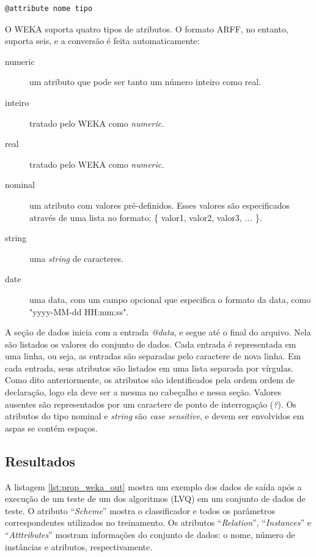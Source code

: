 \begin{lstlisting}[caption=Formato de uma entrada \emph{@attribute}, label=lst:prop_attribute_out]
@attribute nome tipo
\end{lstlisting}

O WEKA suporta quatro tipos de atributos. O formato ARFF, no entanto, suporta seis, e a conversão é feita automaticamente:

\begin{description}
    \item[numeric] um atributo que pode ser tanto um número inteiro como real.
    \item[inteiro] tratado pelo WEKA como \emph{numeric}.
    \item[real] tratado pelo WEKA como \emph{numeric}.
    \item[nominal] um atributo com valores pré-definidos. Esses valores são especificados através de uma lista no formato: \{ valor1, valor2, valor3, \emph{...} \}.
    \item[string] uma \emph{string} de caracteres.
    \item[date] uma data, com um campo opcional que especifica o formato da data, como "yyyy-MM-dd HH:mm:ss".
\end{description}

A seção de dados inicia com a entrada \emph{@data}, e segue até o final do arquivo. Nela são listados os valores do conjunto de dados. Cada entrada é representada em uma linha, ou seja, as entradas são separadas pelo caractere de nova linha. Em cada entrada, seus atributos são listados em uma lista separada por vírgulas. Como dito anteriormente, os atributos são identificados pela ordem ordem de declaração, logo ela deve ser a mesma no cabeçalho e nessa seção. Valores ausentes são representados por um caractere de ponto de interrogação (\emph{?}). Os atributos do tipo nominal e \emph{string} são \emph{case sensitive}, e devem ser envolvidos em aspas se contém espaços.

\subsection{Resultados}
\label{sec:prop_results}

A listagem \ref{lst:prop_weka_out} mostra um exemplo dos dados de saída após a execução de um teste de um dos algoritmos (LVQ) em um conjunto de dados de teste. O atributo ``\emph{Scheme}'' mostra o classificador e todos os parâmetros correspondentes utilizados no treinamento. Os atributos ``\emph{Relation}'', ``\emph{Instances}'' e ``\emph{Atttributes}'' mostram informações do conjunto de dados: o nome, número de instâncias e atributos, respectivamente.

